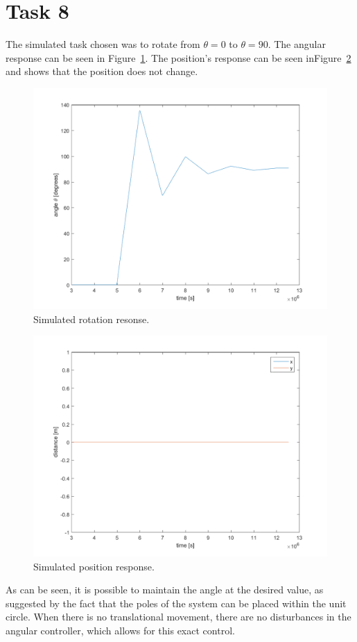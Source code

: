 \documentclass[a4paper,12pt,oneside,onecolumn]{article} %
\begin{document}
\section*{Task 8}
    The simulated task chosen was to rotate from $\theta = 0$ to $\theta = 90$.
    The angular response can be seen in Figure~\ref{fig:task8_angleplot}. The
    position's response can be seen inFigure~\ref{fig:task8_posplot} and shows
    that the position does not change.  \begin{figure}[H]
        \centering
        \includegraphics[scale = 0.5]{../matlab/images/task8_angleplot.png}
        \caption{Simulated rotation resonse.}
        \label{fig:task8_angleplot}
    \end{figure}
    \begin{figure}[H]
        \centering
        \includegraphics[scale = 0.5]{../matlab/images/task8_posplot.png}
        \caption{Simulated position response.}
        \label{fig:task8_posplot}
    \end{figure}
As can be seen, it is possible to maintain the angle at the desired value, as
suggested by the fact that the poles of the system can be placed within the unit
circle. When there is no translational movement, there are no disturbances in
the angular controller, which allows for this exact control.
\end{document}
